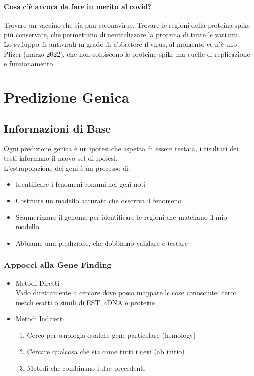 \documentclass{article}
\begin{document}
\paragraph{Cosa c'è ancora da fare in merito al covid?}
Trovare un vaccino che sia pan-coronavirus. Trovare le regioni della proteina spike più conservate, che permettano di neutralizzare la proteina di tutte le varianti.\\
Lo sviluppo di antivirali in grado di abbattere il virus, al momento ce n'è uno Pfizer (marzo 2022), che non colpiscono le proteine spike ma quelle di replicazione e funzionamento.

\section{Predizione Genica}
\subsection{Informazioni di Base}
Ogni predizione genica è un ipotesi che aspetta di essere testata, i risultati dei testi informano il nuovo set di ipotesi.\\
L'estrapolazione dei geni è un processo di:
\begin{itemize}
    \item Identificare i fenomeni comuni nei geni noti 
    \item Costruire un modello accurato che descriva il fenomeno 
    \item Scannerizzare il genoma per identificare le regioni che matchano il mio modello 
    \item Abbiamo una predizione, che dobbiamo validare e testare
\end{itemize}
\subsubsection{Appocci alla Gene Finding}
\begin{itemize}
    \item Metodi Diretti \\ Vado direttamente a cercare dove posso mappare le cose conosciute: cerco metch esatti o simili di EST, cDNA o proteine
    \item Metodi Indiretti
        \begin{enumerate}
            \item Cerco per omologia qualche gene particolare (homology)
            \item Cercare qualcosa che sia come tutti i geni (ab initio)
            \item Metodi che combinano i due precedenti
        \end{enumerate}
\end{itemize}
\end{document}
